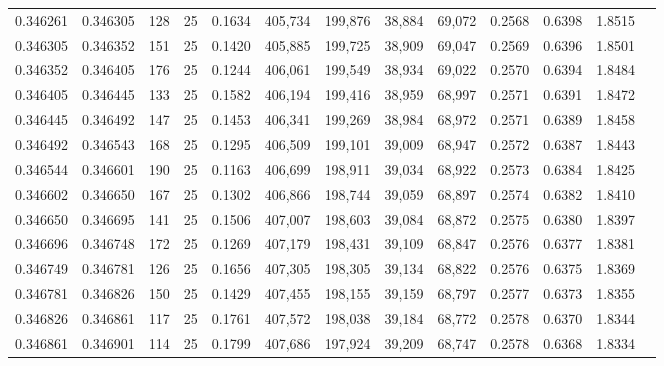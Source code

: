 \begin{tabular}{rrrrrrrrrrrrr}
0.346261 & 0.346305 &   128 &  25 &                                     0.1634 & 405,734 & 199,876 &  38,884 &  69,072 & 0.2568 & 0.6398 & 1.8515 \\
0.346305 & 0.346352 &   151 &  25 &                                     0.1420 & 405,885 & 199,725 &  38,909 &  69,047 & 0.2569 & 0.6396 & 1.8501 \\
0.346352 & 0.346405 &   176 &  25 &                                     0.1244 & 406,061 & 199,549 &  38,934 &  69,022 & 0.2570 & 0.6394 & 1.8484 \\
0.346405 & 0.346445 &   133 &  25 &                                     0.1582 & 406,194 & 199,416 &  38,959 &  68,997 & 0.2571 & 0.6391 & 1.8472 \\
0.346445 & 0.346492 &   147 &  25 &                                     0.1453 & 406,341 & 199,269 &  38,984 &  68,972 & 0.2571 & 0.6389 & 1.8458 \\
0.346492 & 0.346543 &   168 &  25 &                                     0.1295 & 406,509 & 199,101 &  39,009 &  68,947 & 0.2572 & 0.6387 & 1.8443 \\
0.346544 & 0.346601 &   190 &  25 &                                     0.1163 & 406,699 & 198,911 &  39,034 &  68,922 & 0.2573 & 0.6384 & 1.8425 \\
0.346602 & 0.346650 &   167 &  25 &                                     0.1302 & 406,866 & 198,744 &  39,059 &  68,897 & 0.2574 & 0.6382 & 1.8410 \\
0.346650 & 0.346695 &   141 &  25 &                                     0.1506 & 407,007 & 198,603 &  39,084 &  68,872 & 0.2575 & 0.6380 & 1.8397 \\
0.346696 & 0.346748 &   172 &  25 &                                     0.1269 & 407,179 & 198,431 &  39,109 &  68,847 & 0.2576 & 0.6377 & 1.8381 \\
0.346749 & 0.346781 &   126 &  25 &                                     0.1656 & 407,305 & 198,305 &  39,134 &  68,822 & 0.2576 & 0.6375 & 1.8369 \\
0.346781 & 0.346826 &   150 &  25 &                                     0.1429 & 407,455 & 198,155 &  39,159 &  68,797 & 0.2577 & 0.6373 & 1.8355 \\
0.346826 & 0.346861 &   117 &  25 &                                     0.1761 & 407,572 & 198,038 &  39,184 &  68,772 & 0.2578 & 0.6370 & 1.8344 \\
0.346861 & 0.346901 &   114 &  25 &                                     0.1799 & 407,686 & 197,924 &  39,209 &  68,747 & 0.2578 & 0.6368 & 1.8334 \\

\end{tabular}
